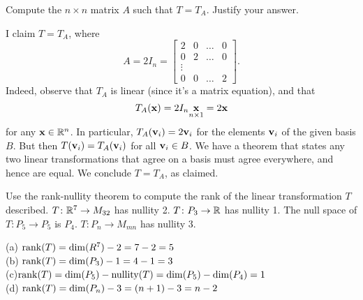 Compute the $n\times n$ matrix $A$ such that $T=T_A$. Justify your answer.
\\
\begin{solution}
I claim $T=T_A$, where 
\[
A=2I_n=\begin{bmatrix}
2&0&\dots&0\\
0&2&\dots&0\\
\vdots \\
0&0&\dots&2
\end{bmatrix}.
\]
Indeed, observe that $T_A$ is linear (since it's a matrix equation), and that 
\[
T_A({\mathbf x})=2I_n\underset{n\times 1}{{\mathbf x}}=2{\mathbf x}
\]
 for any ${\mathbf x}\in{\mathbb R}^n$. In particular, $T_A({\mathbf v}_i)=2{\mathbf v}_i$ for the elements ${\mathbf v}_i$ of the given basis $B$. But then $T({\mathbf v}_i)=T_A({\mathbf v}_i)$ for all ${\mathbf v}_i\in B$. We have a theorem that states any two linear transformations that agree on a basis must agree everywhere, and hence are equal. We conclude $T=T_A$, as claimed. 
\end{solution}
\ii Use the rank-nullity theorem to compute the rank of the linear transformation $T$ described. 
\bb
\ii $T\colon{\mathbb R}^7\rightarrow M_{32}$ has nullity 2.
\ii $T\colon P_3\rightarrow {\mathbb R}$ has nullity 1.
\ii The null space of $T\colon P_5 \rightarrow P_5$ is $P_4$.
\ii $T\colon P_n\rightarrow M_{mn}$ has nullity 3.
\ee
\begin{solution}
\noindent
(a)
$\operatorname{rank}(T) = \dim(R^7) - 2 = 7-2=5$
\\
(b)
$\operatorname{rank}(T) = \dim(P_3) - 1 = 4-1=3$
\\
(c)$\operatorname{rank}(T) = \dim(P_5) - \operatorname{nullity}(T) = \dim(P_5)-\dim(P_4) = 1$
\\
(d) 
$\operatorname{rank}(T) = \dim(P_n)-3 = (n+1) - 3 = n-2$
\end{solution}

